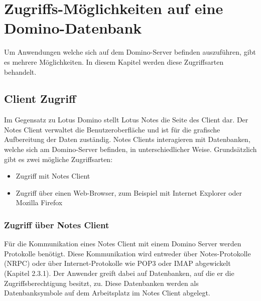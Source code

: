 \chapter{Zugriffs-Möglichkeiten auf eine Domino-Datenbank}



Um Anwendungen welche sich auf dem Domino-Server befinden auszuführen, gibt es mehrere Möglichkeiten.
In diesem Kapitel werden diese Zugriffsarten behandelt.\newline



\section{Client Zugriff}
\label{sec:5webzugriff}

Im Gegensatz zu Lotus Domino stellt Lotus Notes die Seite des Client dar. Der Notes Client verwaltet die Benutzeroberfläche und ist für die grafische Aufbereitung
der Daten zuständig.\newline
Notes Clients interagieren mit Datenbanken, welche sich am Domino-Server befinden, in unterschiedlicher Weise.
Grundsätzlich gibt es zwei mögliche Zugriffsarten:
\begin{itemize}
\item Zugriff mit Notes Client 
\item Zugriff über einen Web-Browser, zum Beispiel mit Internet Explorer oder Mozilla Firefox 
\end{itemize}



\subsection{Zugriff über Notes Client}
\label{sec:5webzugriff}

Für die Kommunikation eines Notes Client mit einem Domino Server werden Protokolle benötigt. Diese Kommunikation wird entweder über Notes-Protokolle
(NRPC) oder über Internet-Protokolle wie POP3 oder IMAP abgewickelt (Kapitel 2.3.1).
Der Anwender greift dabei auf Datenbanken, auf die er die Zugriffsberechtigung besitzt, zu. 
Diese Datenbanken werden als Datenbanksymbole auf dem
Arbeitsplatz im Notes Client abgelegt\cite{ebel}.

